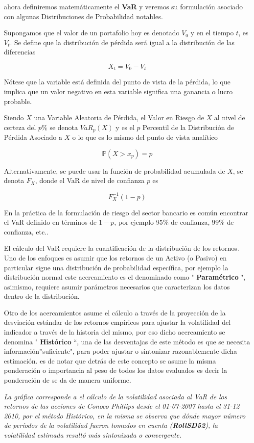 \documentclass[]{article}
\begin{document}
ahora definiremos matemáticamente el \textbf{VaR} y veremos su
formulación asociado con algunas Distribuciones de Probabilidad
notables.

Supongamos que el valor de un portafolio hoy es denotado \(V_0\) y en el
tiempo \(t\), es \(V_t\). Se define que la distribución de pérdida será
igual a la distribución de las diferencias

\[X_t = V_0 - V_t\]

Nótese que la variable está definida del punto de vista de la pérdida,
lo que implica que un valor negativo en esta variable significa una
ganancia o lucro probable.

Siendo \(X\) una Variable Aleatoria de Pérdida, el Valor en Riesgo de
\(X\) al nivel de certeza del \(p\)\% se denota \(VaR_{p}(X)\) y es el
\(p\) Percentil de la Distribución de Pérdida Asociado a \(X\) o lo que
es lo mismo del punto de vista analítico

\[\mathbb{P}(X>x_p)=p\]

Alternativamente, se puede usar la función de probabilidad acumulada de
\(X\), se denota \(F_X\), donde el VaR de nivel de confianza \(p\) es

\[F_{X}^{-1}(1-p)\]

En la práctica de la formulación de riesgo del sector bancario es común
encontrar el VaR definido en términos de \(1-p\), por ejemplo 95\% de
confianza, 99\% de confianza, etc..

El cálculo del VaR requiere la cuantificación de la distribución de los
retornos. Uno de los enfoques es asumir que los retornos de un Activo (o
Pasivo) en particular sigue una distribución de probabilidad específica,
por ejemplo la distribución normal este acercamiento es el denominado
como " \textbf{Paramétrico} ", asimismo, requiere asumir parámetros
necesarios que caracterizan los datos dentro de la distribución.

Otro de los acercamientos asume el cálculo a través de la proyección de
la desviación estándar de los retornos empíricos para ajustar la
volatilidad del indicador a través de la historia del mismo, por eso
dicho acercamiento se denomina " \textbf{Histórico} ``, una de las
desventajas de este método es que se necesita información''suficiente",
para poder ajustar o sintonizar razonablemente dicha estimación. es de
notar que detrás de este concepto se asume la misma ponderación o
importancia al peso de todos los datos evaluados es decir la ponderación
de se da de manera uniforme.

\emph{La gráfica corresponde a el cálculo de la volatilidad asociada al
VaR de los retornos de las acciones de Conoco Phillips desde el
01-07-2007 hasta el 31-12 2010, por el método Histórico, en la misma se
observa que dónde mayor número de períodos de la volatilidad fueron
tomados en cuenta (\textbf{RollSD52}), la volatilidad estimada resultó
más sintonizada o convergente.}
\end{document}
